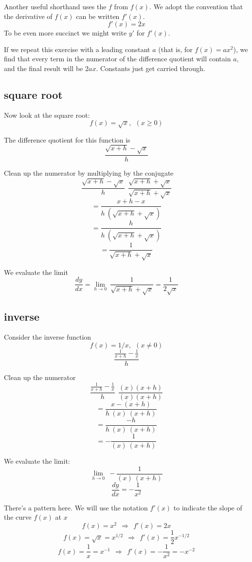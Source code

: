 \documentclass[11pt, oneside]{article}
\begin{document}
Another useful shorthand uses the $f$ from $f(x)$.  We adopt the convention that the derivative of $f(x)$ can be written $f'(x)$.
\[    f'(x) = 2x \]
To be even more succinct we might write $y'$ for $f'(x)$.

If we repeat this exercise with a leading constant $a$ (that is, for $f(x) = ax^2$), we find that every term in the numerator of the difference quotient will contain $a$, and the final result will be $2ax$.  Constants just get carried through.

\subsection*{square root}

Now look at the square root:
\[  f(x)=\sqrt{x}, \ \ (x \ge 0) \]

The difference quotient for this function is
\[   \frac{\sqrt{x+h} - \sqrt{x}}{h} \]

Clean up the numerator by multiplying by the conjugate
\[    \frac{\sqrt{x+h} - \sqrt{x}}{h} \ \  \frac{\sqrt{x+h} + \sqrt{x}}{\sqrt{x+h} + \sqrt{x}} \]
\[    = \frac{x + h - x}{h \ (\sqrt{x+h} + \sqrt{x})} \]
\[    = \frac{h}{h \ (\sqrt{x+h} + \sqrt{x}) } \]
\[    = \frac{1}{\sqrt{x+h} + \sqrt{x}} \]

We evaluate the limit
\[    \frac{dy}{dx} = \lim_{h \to 0} \  \frac{1}{\sqrt{x+h} + \sqrt{x}} = \frac{1}{2\sqrt{x}} \]

\subsection*{inverse}

Consider the inverse function
\[   f(x)=1/x, \ \ (x \ne 0) \]
\[    \frac {  \frac{1}{x+h} - \frac{1}{x}  }  {h} \]

Clean up the numerator
\[    \frac {  \frac{1}{x+h} - \frac{1}{x}  }  {h} \ \  \frac{(x)(x+h)}{(x)(x+h)} \]
\[    = \frac {x - (x+h)}  {h\ (x) \ (x+h)} \]
\[    = \frac {-h}  {h\ (x) \ (x+h)} \]
\[    = -\frac {1}  {(x) \ (x+h)} \]

We evaluate the limit:
\[    \lim_{h \to 0} \  -\frac {1}  {(x) \ (x+h)} \]
\[ \frac{dy}{dx} = - \frac{1}{x^2} \]

There's a pattern here.  We will use the notation $f'(x)$ to indicate the slope of the curve $f(x)$ at $x$
\[       f(x) = x^2 \ \ \Rightarrow \ \  f'(x) = 2x \]
\[       f(x) = \sqrt{x} = x^{1/2}\ \ \Rightarrow \ \  f'(x) = \frac{1}{2}x^{-1/2} \]
\[       f(x) = \frac{1}{x} = x^{-1} \ \ \Rightarrow \ \  f'(x) = -\frac{1}{x^2} = -x^{-2} \]
\end{document}
